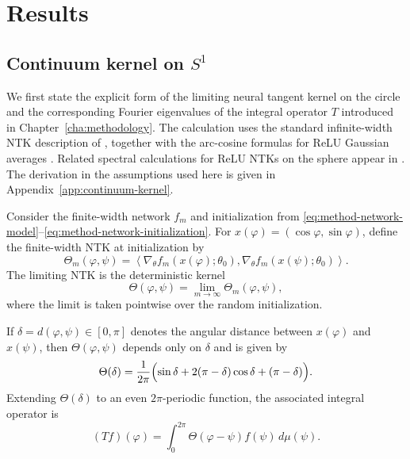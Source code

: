 \chapter{Results}
\label{cha:results}

\section{Continuum kernel on \(S^1\)}

We first state the explicit form of the limiting neural tangent kernel on the circle and the
corresponding Fourier eigenvalues of the integral operator \(T\) introduced in
Chapter~\ref{cha:methodology}. The calculation uses the standard infinite-width NTK
description of \citet{jacot2018ntk}, together with the
arc-cosine formulas for ReLU Gaussian averages \citep{cho2009kernel}. Related spectral
calculations for ReLU NTKs on the sphere appear in
\citet{basri2019convergence,bietti2019inductivebiasneuraltangent,cao2020understandingspectralbiasdeep}. The derivation in the
assumptions used here is given in Appendix~\ref{app:continuum-kernel}.

\begin{proposition}
	\label{prop:results-continuum-ntk}
	Consider the finite-width network \(f_m\) and initialization from
	\eqref{eq:method-network-model}--\eqref{eq:method-network-initialization}.
	For \(x(\varphi)=(\cos\varphi,\sin\varphi)\), define the finite-width NTK at
	initialization by
	\[
		\Theta_m(\varphi,\psi)
		=
		\left\langle
		\nabla_\theta f_m(x(\varphi);\theta_0),
		\nabla_\theta f_m(x(\psi);\theta_0)
		\right\rangle .
	\]
	The limiting NTK is the deterministic kernel
	\[
		\Theta(\varphi,\psi)
		=
		\lim_{m\to\infty}\Theta_m(\varphi,\psi),
	\]
	where the limit is taken pointwise over the random initialization.

	If \(\delta=d(\varphi,\psi)\in[0,\pi]\) denotes the angular distance
	between \(x(\varphi)\) and \(x(\psi)\), then \(\Theta(\varphi,\psi)\) depends
	only on \(\delta\) and is given by
	\begin{equation}
		\Theta(\delta)
		=
		\frac{1}{2\pi}
		\Bigl(
		\sin\delta + 2(\pi-\delta)\cos\delta + (\pi-\delta)
		\Bigr).
		\label{eq:results-continuum-ntk}
	\end{equation}
	Extending \(\Theta(\delta)\) to an even \(2\pi\)-periodic function, the
	associated integral operator is
	\begin{equation}
		(Tf)(\varphi)
		=
		\int_0^{2\pi}\Theta(\varphi-\psi)f(\psi)\,d\mu(\psi).
		\label{eq:results-continuum-operator}
	\end{equation}
\end{proposition}

